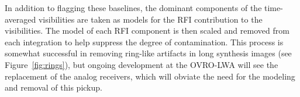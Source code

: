 \begin{bibunit}
In addition to flagging these baselines, the dominant components of the time-averaged visibilities
are taken as models for the RFI contribution to the visibilities. The model of each RFI component is
then scaled and removed from each integration to help suppress the degree of contamination. This
process is somewhat successful in removing ring-like artifacts in long synthesis images (see
Figure~\ref{fig:rings}), but ongoing development at the OVRO-LWA will see the replacement of the
analog receivers, which will obviate the need for the modeling and removal of this pickup.

\end{bibunit}

